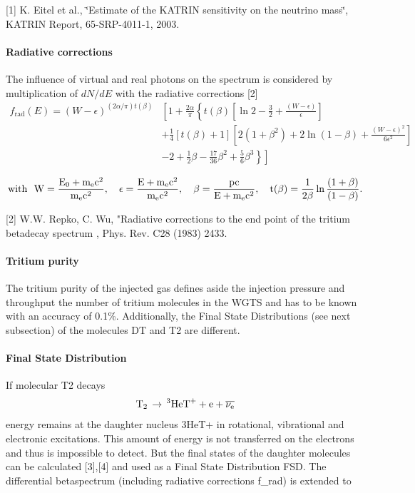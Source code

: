 \mbox{[}1\mbox{]} K. Eitel et al., \char`\"{}Estimate of the KATRIN sensitivity on the neutrino mass\char`\"{}, KATRIN Report, 65-\/SRP-\/4011-\/1, 2003.

\paragraph{Radiative corrections}\label{_s_s_cmain_radcorr}
The influence of virtual and real photons on the spectrum is considered by multiplication of $dN/dE$ with the radiative corrections \mbox{[}2\mbox{]} 
\begin{equation}
	\begin{split}
	f_{\text{rad}}(E) = (W-\epsilon)^{(2\alpha / \pi) t(\beta)} &\left[ 1 + \frac{2\alpha}{\pi} \left\{ t(\beta)\left[ \ln 2 - \frac{3}{2} + \frac{(W-\epsilon)}{\epsilon}\right] \right. \right. \\ & + \frac{1}{4}[t(\beta) + 1]\left[2 (1 + \beta^2) + 2 \ln(1-\beta) + \frac{(W-\epsilon)^2}{6\epsilon^2}\right] \\ & \left. \left. - 2 + \frac{1}{2} \beta - \frac{17}{36} \beta^2 + \frac{5}{6} \beta^3 \right\}\right] 
	\label{eq:radcorrection}
	\end{split} 
\end{equation}

\[ \rm{with}~~W=\frac{E_0 + m_e c^2}{m_e c^2},~~~ \epsilon = \frac{E + m_e c^2}{m_e c^2},~~~ \beta = \frac{pc}{E + m_e c^2},~~~ t(\beta) = \frac{1}{2\beta} \ln \frac{(1+\beta)}{(1-\beta)}. \]

\mbox{[}2\mbox{]} W.W. Repko, C. Wu, "Radiative corrections to the end point of the tritium betadecay spectrum , Phys. Rev. C28 (1983) 2433.

\paragraph{Tritium purity}\label{_s_s_cmain_epstrit}
The tritium purity of the injected gas defines aside the injection pressure and throughput the number of tritium molecules in the WGTS and has to be known with an accuracy of 0.1\%. Additionally, the Final State Distributions (see next subsection) of the molecules DT and T2 are different.\hypertarget{_s_s_cmain_fsd}{}

\paragraph{Final State Distribution}\label{_s_s_cmain_fsd}
If molecular T2 decays \[ \rm{T}_2\,\rightarrow\,^3\rm{HeT}^+ + \rm{e} + \overline{\nu_{\rm{e}}} \] energy remains at the daughter nucleus 3HeT+ in rotational, vibrational and electronic excitations. This amount of energy is not transferred on the electrons and thus is impossible to detect. But the final states of the daughter molecules can be calculated \mbox{[}3\mbox{]},\mbox{[}4\mbox{]} and used as a Final State Distribution FSD. The differential betaspectrum (including radiative corrections f\_\-rad) is extended to 

